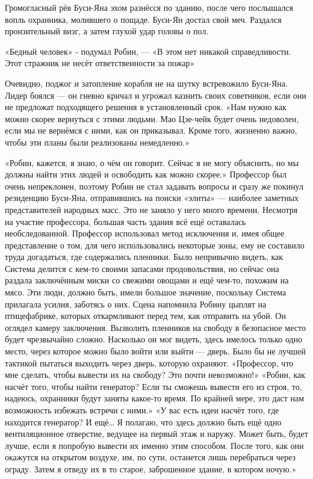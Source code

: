 \documentclass[a4paper,12pt]{book}
\begin{document}
	Громогласный рёв Буси-Яна эхом разнёсся по зданию, после чего послышался вопль охранника, молившего о пощаде. Буси-Ян достал свой меч. Раздался пронзительный визг, а затем глухой удар головы о пол.

	«Бедный человек» - подумал Робин, —
	«В этом нет никакой справедливости. Этот стражник не несёт ответственности за пожар»

	Очевидно, поджог и затопление корабля не на шутку встревожило Буси-Яна. Лидер боялся — он гневно кричал и угрожал казнить своих советников, если они не предложат подходящего решения в установленный срок.
	«Нам нужно как можно скорее вернуться с этими людьми. Мао Цзе-чейк будет очень недоволен, если мы не вернёмся с ними, как он приказывал. Кроме того, жизненно важно, чтобы эти планы были реализованы немедленно.»

	«Робин, кажется, я знаю, о чём он говорит. Сейчас я не могу объяснить, но мы должны найти этих людей и освободить как можно скорее.»
	Профессор был очень непреклонен, поэтому Робин не стал задавать вопросы и сразу же покинул резиденцию Буси-Яна, отправившись на поиски «элиты» — наиболее заметных представителей народных масс.
	Это не заняло у него много времени. Несмотря на участие профессора, большая часть здания всё ещё оставалась необследованной. Профессор использовал метод исключения и, имея общее представление о том, для чего использовались некоторые зоны, ему не составило труда догадаться, где содержались пленники.
	Было непривычно видеть, как Система делится с кем-то своими запасами продовольствия, но сейчас она раздала заключённым миски со свежими овощами и ещё чем-то, похожим на мясо. Эти люди, должно быть, имели большое значение, поскольку Система прилагала усилия, заботясь о них. Сцена напомнила Робину цыплят на птицефабрике, которых откармливают перед тем, как отправить на убой.
	Он оглядел камеру заключения. Вызволить пленников на свободу в безопасное место будет чрезвычайно сложно. Насколько он мог видеть, здесь имелось только одно место, через которое можно было войти или выйти — дверь. Было бы не лучшей тактикой пытаться выходить через дверь, которую охраняют.
	«Профессор, что мне сделать, чтобы вывести их на свободу? Это почти невозможно!»
	«Робин, как насчёт того, чтобы найти генератор? Если ты сможешь вывести его из строя, то, надеюсь, охранники будут заняты какое-то время. По крайней мере, это даст нам возможность избежать встречи с ними.»
	«У вас есть идеи насчёт того, где находится генератор? И ещё… Я полагаю, что здесь должно быть ещё одно вентиляционное отверстие, ведущее на первый этаж и наружу. Может быть, будет лучше, если я попробую вывести их именно этим способом. После того, как они окажутся на открытом воздухе, им, по сути, останется лишь перебраться через ограду. Затем я отведу их в то старое, заброшенное здание, в котором ночую.»
\end{document}
